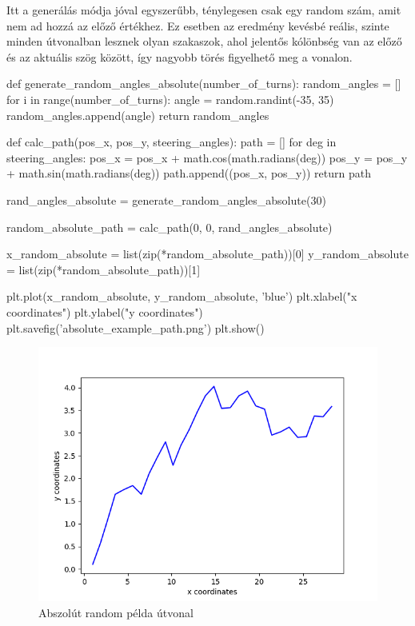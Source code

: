 Itt a generálás módja jóval egyszerűbb, ténylegesen csak egy random szám, amit nem ad hozzá az előző értékhez. Ez esetben az eredmény kevésbé reális, szinte minden útvonalban lesznek olyan szakaszok, ahol jelentős kólönbség van az előző és az aktuális szög között, így nagyobb törés figyelhető meg a vonalon.\\

\begin{python}
def generate_random_angles_absolute(number_of_turns):
    random_angles = []
    for i in range(number_of_turns):
        angle = random.randint(-35, 35)
        random_angles.append(angle)
    return random_angles
    
def calc_path(pos_x, pos_y, steering_angles):
    path = []
    for deg in steering_angles:
        pos_x = pos_x + math.cos(math.radians(deg))
        pos_y = pos_y + math.sin(math.radians(deg))
        path.append((pos_x, pos_y))
    return path
    
rand_angles_absolute = generate_random_angles_absolute(30)

random_absolute_path = calc_path(0, 0, rand_angles_absolute)

x_random_absolute = list(zip(*random_absolute_path))[0]
y_random_absolute = list(zip(*random_absolute_path))[1]

plt.plot(x_random_absolute, y_random_absolute, 'blue')
plt.xlabel("x coordinates")
plt.ylabel("y coordinates")
plt.savefig('absolute_example_path.png')
plt.show()
\end{python}

\begin{figure}[h!]
\centering
\includegraphics[scale=0.75]{images/absolute_example_path.png}
\caption{Abszolút random példa útvonal}
\label{fig:absolute_path}
\end{figure}


